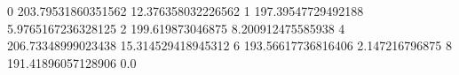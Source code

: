 0 203.79531860351562 12.376358032226562
1 197.39547729492188 5.9765167236328125
2 199.619873046875 8.200912475585938
4 206.73348999023438 15.314529418945312
6 193.56617736816406 2.147216796875
8 191.41896057128906 0.0
